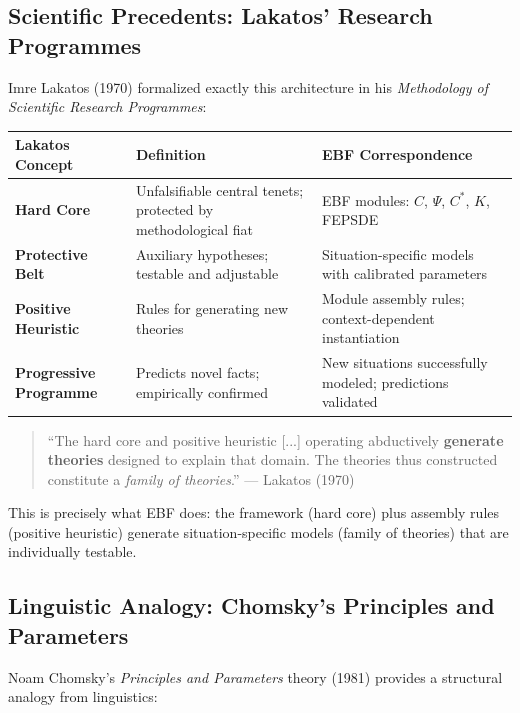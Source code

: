 \subsection{Scientific Precedents: Lakatos' Research Programmes}

Imre Lakatos (1970) formalized exactly this architecture in his \textit{Methodology of
Scientific Research Programmes}:

\begin{center}
\renewcommand{\arraystretch}{1.4}
\begin{tabular}{@{}p{4cm}p{4cm}p{5cm}@{}}
\toprule
\textbf{Lakatos Concept} & \textbf{Definition} & \textbf{EBF Correspondence} \\
\midrule
\textbf{Hard Core} & Unfalsifiable central tenets; protected by methodological fiat &
    EBF modules: $C$, $\Psi$, $C^*$, $K$, FEPSDE \\
\textbf{Protective Belt} & Auxiliary hypotheses; testable and adjustable &
    Situation-specific models with calibrated parameters \\
\textbf{Positive Heuristic} & Rules for generating new theories &
    Module assembly rules; context-dependent instantiation \\
\textbf{Progressive Programme} & Predicts novel facts; empirically confirmed &
    New situations successfully modeled; predictions validated \\
\bottomrule
\end{tabular}
\end{center}

\begin{quote}
``The hard core and positive heuristic [...] operating abductively \textbf{generate theories}
designed to explain that domain. The theories thus constructed constitute a \textit{family
of theories}.'' --- Lakatos (1970)
\end{quote}

This is precisely what EBF does: the framework (hard core) plus assembly rules (positive heuristic)
generate situation-specific models (family of theories) that are individually testable.

\subsection{Linguistic Analogy: Chomsky's Principles and Parameters}

Noam Chomsky's \textit{Principles and Parameters} theory (1981) provides a structural analogy
from linguistics:

